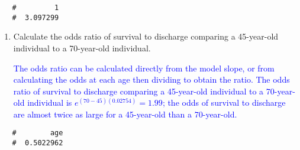 \documentclass[letterpaper,12pt,twoside,]{pinp}
\begin{document}
\begin{enumerate}
\begin{Shaded}
\begin{Highlighting}[]
\OtherTok{=} \SpecialCharTok{\textasciitilde{}} \NormalTok{(} \NormalTok{))}
\OtherTok{=}  \NormalTok{(} \OtherTok{=} \NormalTok{))}

\end{Highlighting}
\end{Shaded}

  \begin{ShadedResult}
   \begin{verbatim}
   #         1 
   #  3.097299
   \end{verbatim}
   \end{ShadedResult}

  \begin{enumerate}
  \def\labelenumii{\alph{enumii})}
  \setcounter{enumii}{4}
  \item
    Calculate the odds ratio of survival to discharge comparing a
    45-year-old individual to a 70-year-old individual.

    \textcolor{blue}{The odds ratio can be calculated directly from the model slope, or from calculating the odds at each age then dividing to obtain the ratio. The odds ratio of survival to discharge comparing a 45-year-old individual to a 70-year-old individual is $e^{(70-45)(0.02754)} = 1.99$; the odds of survival to discharge are almost twice as large for a 45-year-old than a 70-year-old.}
  \end{enumerate}

\begin{Shaded}
\begin{Highlighting}[]
\OtherTok{=}\SpecialCharTok{$}\NormalTok{coef[}\NormalTok{]}\SpecialCharTok{*}\NormalTok{(}\NormalTok{)}
\end{Highlighting}
\end{Shaded}

  \begin{ShadedResult}
   \begin{verbatim}
   #        age 
   #  0.5022962
   \end{verbatim}
   \end{ShadedResult}


\end{enumerate}
\end{document}
